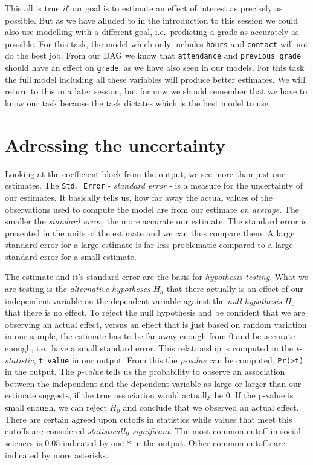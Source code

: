 \documentclass[
]{book}
\begin{document}
This all is true \emph{if} our goal is to estimate an effect of interest as precisely
as possible. But as we have alluded to in the introduction to this session we
could also use modelling with a different goal, i.e.~predicting a grade as
accurately as possible. For this task, the model which only includes \texttt{hours} and
\texttt{contact} will not do the best job. From our DAG we know that \texttt{attendance} and
\texttt{previous\_grade} should have an effect on \texttt{grade}, as we have also seen in our
models. For this task the full model including all these variables will produce
better estimates. We will return to this in a later session, but for now we
should remember that we have to know our task because the task dictates which is
the best model to use.

\hypertarget{adressing-the-uncertainty}{%
\section{Adressing the uncertainty}\label{adressing-the-uncertainty}}

Looking at the coefficient block from the output, we see more
than just our estimates. The \texttt{Std.\ Error} - \emph{standard error} - is a measure for the
uncertainty of our estimates. It basically tells us, how far away the actual
values of the observations used to compute the model are from our estimate
\emph{on average}. The smaller the \emph{standard error}, the more accurate our
estimate. The standard error is presented in the units of the estimate and we
can thus compare them. A large standard error for a large estimate is far less
problematic compared to a large standard error for a small estimate.

The estimate and it's standard error are the basis for \emph{hypothesis testing}.
What we are testing is the \emph{alternative hypotheses} \(H_a\) that there actually
is an effect of our independent variable on the dependent variable against the
\emph{null hypothesis} \(H_0\) that there is no effect. To reject the null hypothesis
and be confident that we are observing an actual effect, versus an effect that
is just based on random variation in our sample, the estimate has to be far
away enough from \(0\) and be accurate enough, i.e.~have a small standard error.
This relationship is computed in the \emph{t-statistic}, \texttt{t\ value} in
our output. From this the \emph{p-value} can be computed, \texttt{Pr(\textgreater{}\textbar{}t\textbar{})} in the output.
The \emph{p-value} tells us the probability to observe an association
between the independent and the dependent variable as large or larger than our
estimate suggests, if the true association would actually be \(0\). If the p-value
is small enough, we can reject \(H_0\) and conclude that we observed an actual
effect. There are certain agreed upon cutoffs in statistics while values that
meet this cutoffs are considered \emph{statistically significant}. The most common
cutoff in social sciences is \(0.05\) indicated by one \texttt{*} in the output.
Other common cutoffs are indicated by more asterisks.
\end{document}
